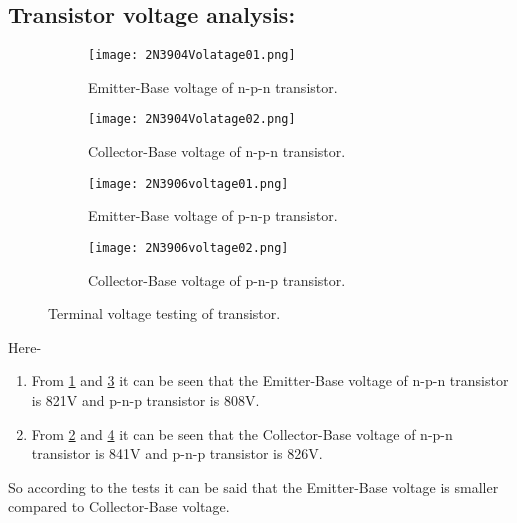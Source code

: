 \documentclass[a4paper, 14pt]{extarticle}
\begin{document}
    \newpage
    
        \subsection{Transistor voltage analysis:}
            \begin{figure}[h]
                \centering
                \begin{subfigure}[h]{0.4\textwidth} %
                    \texttt{[image: 2N3904Volatage01.png]}
                        \caption{Emitter-Base voltage of n-p-n transistor.}
                        \label{fig:subfig5}
                \end{subfigure}
                \hfill
                \begin{subfigure}[h]{0.4\textwidth} %
                \centering
                    \texttt{[image: 2N3904Volatage02.png]}
                        \caption{Collector-Base voltage of n-p-n transistor.}
                        \label{fig:subfig6}
                    \end{subfigure}
                \vspace{25pt} 
                \begin{subfigure}[h]{0.4\textwidth} %
                    \centering
                    \texttt{[image: 2N3906voltage01.png]}
                    \caption{Emitter-Base voltage of p-n-p transistor.}
                    \label{fig:subfig7}
                \end{subfigure}
                \hfill
                \begin{subfigure}[h]{0.4\textwidth} %
                    \texttt{[image: 2N3906voltage02.png]}
                    \caption{Collector-Base voltage of p-n-p transistor.}
                    \label{fig:subfig8}
                \end{subfigure}
                \vspace{5pt}
                \caption{Terminal voltage testing of transistor.}
                \label{fig:mainfig2}
            \end{figure}
            Here-
            \begin{enumerate}
                \item From \ref{fig:subfig5} and \ref{fig:subfig7} it can be seen that the Emitter-Base voltage of n-p-n transistor is 821V and p-n-p transistor is 808V.
                \item From \ref{fig:subfig6} and \ref{fig:subfig8} it can be seen that the Collector-Base voltage of n-p-n transistor is 841V and p-n-p transistor is 826V.
            \end{enumerate}
            So according to the tests it can be said that the Emitter-Base voltage is smaller compared to Collector-Base voltage.
\end{document}
